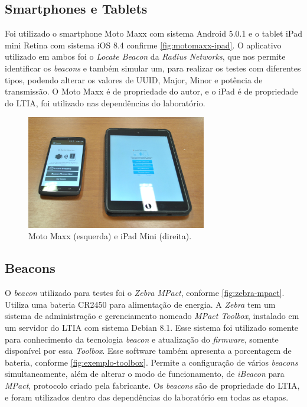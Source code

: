 \documentclass[
		12pt,				%
		openright,			%
		oneside,			%
		a4paper,			%
		chapter=TITLE,		%
		english,			%
		brazil				%
	]{abntex2}
\begin{document}
\subsection{Smartphones e Tablets}\label{sec:smartphone-tablets}

Foi utilizado o smartphone Moto Maxx com sistema Android 5.0.1 e o tablet iPad mini Retina com sistema iOS 8.4 confirme \autoref{fig:motomaxx-ipad}. O aplicativo utilizado em ambos foi o \textit{Locate Beacon} da \textit{Radius Networks}, que nos permite identificar os \textit{beacons} e também simular um, para realizar os testes com diferentes tipos, podendo alterar os valores de UUID, Major, Minor e potência de transmissão. O Moto Maxx é de propriedade do autor, e o iPad é de propriedade do LTIA, foi utilizado nas dependências do laboratório.

\begin{figure}[htb]
	\caption{\label{fig:motomaxx-ipad}Moto Maxx (esquerda) e iPad Mini (direita).}
	\begin{center}
		\includegraphics[width=0.7\textwidth]{img/motomaxx-ipad.jpg}
	\end{center}
\end{figure}

\subsection{Beacons}\label{sec:beacons-modo}

O \textit{beacon} utilizado para testes foi o \textit{Zebra MPact}, conforme \autoref{fig:zebra-mpact}. Utiliza uma bateria CR2450 para alimentação de energia. A \textit{Zebra} tem um sistema de administração e gerenciamento nomeado \textit{MPact Toolbox}, instalado em um servidor do LTIA com sistema Debian 8.1. Esse sistema foi utilizado somente para conhecimento da tecnologia \textit{beacon} e atualização do \textit{firmware}, somente disponível por essa \textit{Toolbox}. Esse software também apresenta a porcentagem de bateria, conforme \autoref{fig:exemplo-toolbox}. Permite a configuração de vários \textit{beacons} simultaneamente, além de alterar o modo de funcionamento, de \textit{iBeacon} para \textit{MPact}, protocolo criado pela fabricante. Os \textit{beacons} são de propriedade do LTIA, e foram utilizados dentro das dependências do laboratório em todas as etapas.
\end{document}
